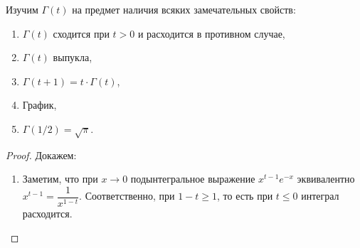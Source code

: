 \begin{theorem} \hypertarget{t41}{}
	Изучим \(\Gamma(t)\) на предмет наличия всяких замечательных \linebreak свойств:
	\begin{enumerate}
		\item \(\Gamma(t)\) сходится при \(t > 0\) и расходится в противном случае,
		\item \(\Gamma(t)\) выпукла,
		\item \(\Gamma(t + 1) = t \cdot \Gamma(t)\),%
		\item График,
		\item \(\Gamma(1/2) = \sqrt{\pi}\).
	\end{enumerate}
\end{theorem}
\begin{proof}
	Докажем:
	\begin{enumerate}
		\item Заметим, что при \(x \to 0\) подынтегральное выражение \(x^{t - 1} e^{-x}\) эквивалентно \(x^{t - 1} = \dfrac{1}{x^{1 - t}}\). Соответственно, при \(1 - t \geqslant 1\), то есть при \(t \leqslant 0\) интеграл расходится.
		

\end{enumerate}
\end{proof}
